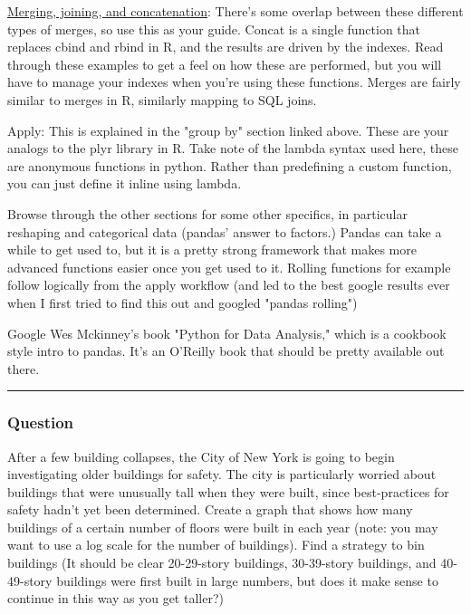 \documentclass[11pt]{article}
\begin{document}
\href{https://pandas.pydata.org/pandas-docs/stable/merging.html}{Merging,
joining, and concatenation}: There's some overlap between these
different types of merges, so use this as your guide. Concat is a single
function that replaces cbind and rbind in R, and the results are driven
by the indexes. Read through these examples to get a feel on how these
are performed, but you will have to manage your indexes when you're
using these functions. Merges are fairly similar to merges in R,
similarly mapping to SQL joins.

Apply: This is explained in the "group by" section linked above. These
are your analogs to the plyr library in R. Take note of the lambda
syntax used here, these are anonymous functions in python. Rather than
predefining a custom function, you can just define it inline using
lambda.

Browse through the other sections for some other specifics, in
particular reshaping and categorical data (pandas' answer to factors.)
Pandas can take a while to get used to, but it is a pretty strong
framework that makes more advanced functions easier once you get used to
it. Rolling functions for example follow logically from the apply
workflow (and led to the best google results ever when I first tried to
find this out and googled "pandas rolling")

Google Wes Mckinney's book "Python for Data Analysis," which is a
cookbook style intro to pandas. It's an O'Reilly book that should be
pretty available out there.

\begin{center}\rule{0.5\linewidth}{\linethickness}\end{center}

\subsubsection{Question}\label{question}

After a few building collapses, the City of New York is going to begin
investigating older buildings for safety. The city is particularly
worried about buildings that were unusually tall when they were built,
since best-practices for safety hadn't yet been determined. Create a
graph that shows how many buildings of a certain number of floors were
built in each year (note: you may want to use a log scale for the number
of buildings). Find a strategy to bin buildings (It should be clear
20-29-story buildings, 30-39-story buildings, and 40-49-story buildings
were first built in large numbers, but does it make sense to continue in
this way as you get taller?)
\end{document}
